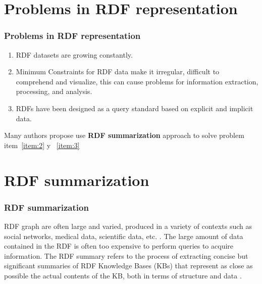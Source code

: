 \documentclass{beamer}
\numberwithin{figure}{section}
\numberwithin{equation}{section}
\begin{document}

\section{Problems in RDF representation}
\begin{frame}
 \frametitle{Problems in RDF representation}
 \begin{enumerate}
	\scriptsize
  	\item RDF datasets are growing constantly.
    \vspace{2.5mm}
  	\item Minimum Constraints for RDF data make it irregular, difficult to comprehend and visualize, this can cause problems for information extraction, processing, and analysis.\label{item:2}
    \vspace{2.5mm}
  	\item  RDFs have been designed as a query standard based on explicit and implicit data.\label{item:3}
 \end{enumerate}
 \vspace{5mm}
 \centering
 Many authors propose use \textbf{RDF summarization} approach to solve problem  item~\ref{item:2} y ~\ref{item:3}
 
 
\end{frame}


\section{RDF summarization}
\begin{frame}
 \frametitle{RDF summarization}
 \justify \scriptsize

 RDF graph are often large and varied, produced in a variety of contexts such as social networks, medical data, scientific data, etc. \cite{Manolescu2018a}. The large amount of data contained in the RDF is often too expensive to perform queries to acquire information.
\vspace{3mm}
The RDF summary refers to the process of extracting concise but significant summaries of RDF Knowledge Bases (KBs) that represent as close as possible the actual contents of the KB, both in terms of structure and data \cite{Zneika2018}.

 \end{frame}
 
\end{document}
